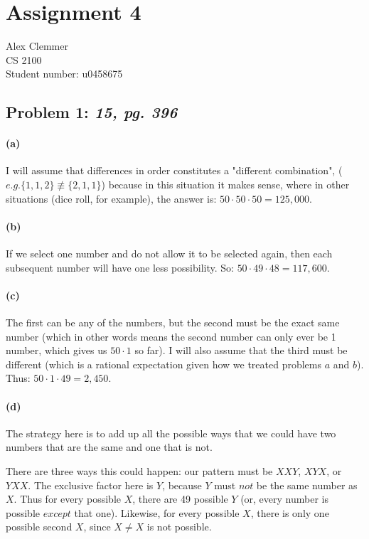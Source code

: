 \documentclass[a4paper]{article}
\begin{document}
\section*{Assignment 4}
Alex Clemmer\\
CS 2100 \\
Student number: u0458675

\subsection*{Problem 1: \textit{15, pg. 396}} 

\paragraph{(a)} I will assume that differences in order constitutes a "different combination", ($\textit{e.g.} \{1,1,2\} \not\equiv \{2,1,1\}$) because in this situation it makes sense, where in other situations (dice roll, for example), the answer is: $50 \cdot 50 \cdot 50 = 125,000$.

\paragraph{(b)} If we select one number and do not allow it to be selected again, then each subsequent number will have one less possibility. So: $50 \cdot 49 \cdot 48 = 117,600$.

\paragraph{(c)} The first can be any of the numbers, but the second must be the exact same number (which in other words means the second number can only ever be 1 number, which gives us $50 \cdot 1$ so far). I will also assume that the third must be different (which is a rational expectation given how we treated problems $\textit{a}$ and $\textit{b}$). Thus: $50 \cdot 1 \cdot 49 = 2,450$.

\paragraph{(d)} The strategy here is to add up all the possible ways that we could have two numbers that are the same and one that is not.

There are three ways this could happen: our pattern must be $XXY$, $XYX$, or $YXX$. The exclusive factor here is $Y$, because $Y$ must $\textit{not}$ be the same number as $X$. Thus for every possible $X$, there are 49 possible $Y$ (or, every number is possible $\textit{except}$ that one). Likewise, for every possible $X$, there is only one possible second $X$, since $X \ne X$ is not possible.
\end{document}
